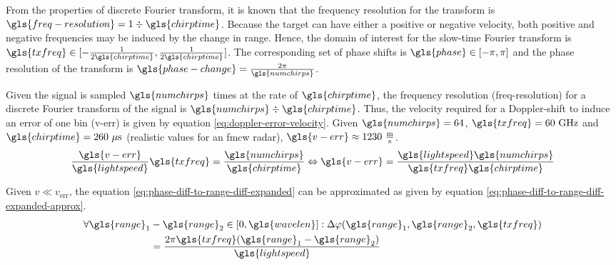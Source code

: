 From the properties of discrete Fourier transform,
it is known that the frequency resolution for the transform is $\gls{freq-resolution} = 1 \div \gls{chirptime}$.
Because the target can have either a positive or negative velocity,
both positive and negative frequencies may be induced by the change in range.
Hence, the domain of interest for the slow-time Fourier transform is
$\gls{txfreq} \in [-\frac{1}{2\gls{chirptime}}, \frac{1}{2\gls{chirptime}}]$.
The corresponding set of phase shifts is $\gls{phase} \in [- \pi, \pi]$
and the phase resolution of the transform is $\gls{phase-change} = \frac{2\pi}{\gls{numchirps}}$.

Given the signal is sampled $\gls{numchirps}$ times at the rate of $\gls{chirptime}$,
the frequency resolution (\gls{freq-resolution}) for a discrete Fourier transform of the signal is $\gls{numchirps} \div \gls{chirptime}$.
Thus, the velocity required for a Doppler-shift to induce an error of one bin (\gls{v-err})
is given by equation \ref{eq:doppler-error-velocity}.
Given $\gls{numchirps} = 64$, $\gls{txfreq} = 60~\mathrm{GHz}$ and $\gls{chirptime} = 260~\mathrm{\mu s}$
(realistic values for an \gls{fmcw} radar), $\gls{v-err} \approx 1230~\frac{\mathrm{m}}{\mathrm{s}}$.
\begin{equation}
    \label{eq:doppler-error-velocity}
    \frac{\gls{v-err}}{\gls{lightspeed}}\gls{txfreq} = \frac{\gls{numchirps}}{\gls{chirptime}}
    \Leftrightarrow 
    \gls{v-err} = \frac{\gls{lightspeed}\gls{numchirps}}{\gls{txfreq} \gls{chirptime}}
\end{equation}

Given $v \ll v_\mathrm{err}$, the equation \ref{eq:phase-diff-to-range-diff-expanded}
can be approximated as given by equation \ref{eq:phase-diff-to-range-diff-expanded-approx}.
\begin{equation}
    \label{eq:phase-diff-to-range-diff-expanded-approx}
    \begin{aligned}
        \forall \gls{range}_1 &- \gls{range}_2 \in [0, \gls{wavelen}] : \Delta \phi(\gls{range}_1, \gls{range}_2 ,\gls{txfreq}) \\
        &= \frac {2\pi \gls{txfreq} (\gls{range}_1-\gls{range}_2)}{\gls{lightspeed}}
    \end{aligned}
\end{equation}

